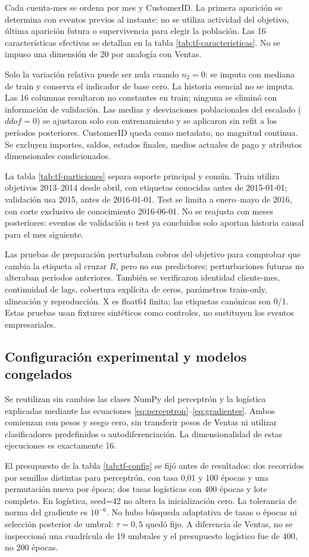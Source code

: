 Cada cuenta-mes se ordena por mes y CustomerID. La primera aparición se determina con eventos previos al instante; no se utiliza actividad del objetivo, última aparición futura o supervivencia para elegir la población. Las 16 características efectivas se detallan en la tabla \ref{tab:tf-caracteristicas}. No se impuso una dimensión de 20 por analogía con Ventas.
\begingroup\small

\endgroup
Solo la variación relativa puede ser nula cuando $n_2=0$: se imputa con mediana de train y conserva el indicador de base cero. La historia esencial no se imputa. Las 16 columnas resultaron no constantes en train; ninguna se eliminó con información de validación. Las medias y desviaciones poblacionales del escalado ($ddof=0$) se ajustaron solo con entrenamiento y se aplicaron sin refit a los períodos posteriores. CustomerID queda como metadato, no magnitud continua. Se excluyen importes, saldos, estados finales, medios actuales de pago y atributos dimensionales condicionados.


La tabla \ref{tab:tf-particiones} separa soporte principal y común. Train utiliza objetivos 2013--2014 desde abril, con etiquetas conocidas antes de 2015-01-01; validación usa 2015, antes de 2016-01-01. Test se limita a enero--mayo de 2016, con corte exclusivo de conocimiento 2016-06-01. No se reajusta con meses posteriores: eventos de validación o test ya concluidos solo aportan historia causal para el mes siguiente.

Las pruebas de preparación perturbaban cobros del objetivo para comprobar que cambia la etiqueta al cruzar $R$, pero no sus predictores; perturbaciones futuras no alteraban períodos anteriores. También se verificaron identidad cliente-mes, continuidad de lags, cobertura explícita de ceros, parámetros train-only, alineación y reproducción. X es float64 finita; las etiquetas canónicas son 0/1. Estas pruebas usan fixtures sintéticos como controles, no sustituyen los eventos empresariales.

\subsection{Configuración experimental y modelos congelados}
Se reutilizan sin cambios las clases NumPy del perceptrón y la logística explicadas mediante las ecuaciones \ref{eq:perceptron}--\ref{eq:gradientes}. Ambos comienzan con pesos y sesgo cero, sin transferir pesos de Ventas ni utilizar clasificadores predefinidos o autodiferenciación. La dimensionalidad de estas ejecuciones es exactamente 16.

El presupuesto de la tabla \ref{tab:tf-config} se fijó antes de resultados: dos recorridos por semillas distintas para perceptrón, con tasa 0,01 y 100 épocas y una permutación nueva por época; dos tasas logísticas con 400 épocas y lote completo. En logística, seed=42 no altera la inicialización cero. La tolerancia de norma del gradiente es $10^{-6}$. No hubo búsqueda adaptativa de tasas o épocas ni selección posterior de umbral: $\tau=0,5$ quedó fijo. A diferencia de Ventas, no se inspeccionó una cuadrícula de 19 umbrales y el presupuesto logístico fue de 400, no 200 épocas.

